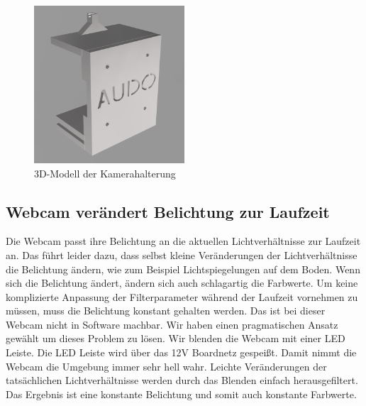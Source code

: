 \begin{figure}[H]
		\centering
		\includegraphics[width=0.5\textwidth]{images/CAD_Halterung.png}
	\caption{3D-Modell der Kamerahalterung}
	\label{fig:halterung}
\end{figure}


\subsection{Webcam verändert Belichtung zur Laufzeit}
\label{sec:belichtung}
Die Webcam passt ihre Belichtung an die aktuellen Lichtverhältnisse zur Laufzeit an.
Das führt leider dazu, dass selbst kleine Veränderungen der Lichtverhältnisse die Belichtung ändern, wie zum Beispiel Lichtspiegelungen auf dem Boden.
Wenn sich die Belichtung ändert, ändern sich auch schlagartig die Farbwerte.
Um keine komplizierte Anpassung der Filterparameter während der Laufzeit vornehmen zu müssen, muss die Belichtung konstant gehalten werden.
Das ist bei dieser Webcam nicht in Software machbar.
Wir haben einen pragmatischen Ansatz gewählt um dieses Problem zu lösen.
Wir blenden die Webcam mit einer LED Leiste.
Die LED Leiste wird über das 12V Boardnetz gespeißt.
Damit nimmt die Webcam die Umgebung immer sehr hell wahr.
Leichte Veränderungen der tatsächlichen Lichtverhältnisse werden durch das Blenden einfach herausgefiltert. 
Das Ergebnis ist eine konstante Belichtung und somit auch konstante Farbwerte.

